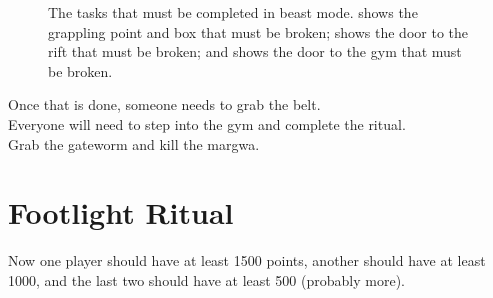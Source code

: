 \documentclass[11pt]{article} %
\begin{document}
	\begin{figure}[b!]
		\centering
		\hfill
		\caption{
			The tasks that must be completed in beast mode.
			 shows the grappling point and box that must be broken;
			 shows the door to the rift that must be broken;
			and  shows the door to the gym that must be broken.
			}
		\label{fig:wf}
	\end{figure}

	Once that is done, someone needs to grab the belt. \\

	Everyone will need to step into the gym and complete the ritual. \\

	Grab the gateworm and kill the margwa.

\newpage
\section{Footlight Ritual}
	
	Now one player should have at least 1500 points, another should have at least 1000, and the last two should have at least 500 (probably more).
\end{document}
